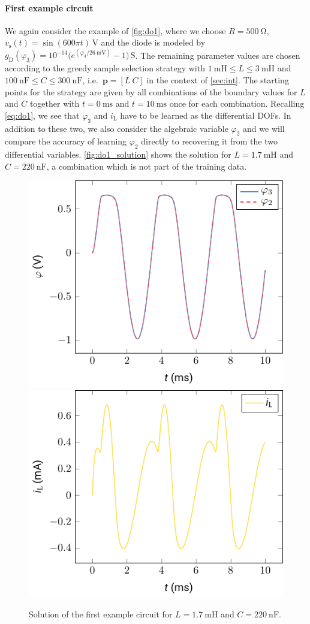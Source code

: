 \documentclass[AMA,STIX1COL]{WileyNJD-v2}
\newcommand{\mb}[1]{\mathbf{#1}}
\newcommand{\mr}[1]{\mathrm{#1}}
\begin{document}
\paragraph{First example circuit}
We again consider the example of \autoref{fig:do1}, where we choose $R = \SI{500}{\ohm}$, $v_\mr{s}(t) = \sin(600 \pi t)\, \si{\volt}$ and the diode is modeled by $g_\mr{D}(\varphi_3) = 10^{-14} \big( e^{(\varphi_3 / \SI{26}{\mV})} - 1 \big)\, \si{\siemens}$. The remaining parameter values are chosen according to the greedy sample selection strategy with $\SI{1}{\milli\henry} \leq L \leq \SI{3}{\milli\henry}$ and $\SI{100}{\nano\farad} \leq C \leq \SI{300}{\nano\farad}$, i.e.~$\mb{p} = [L\ C]$ in the context of \autoref{sec:int}. The starting points for the strategy are given by all combinations of the boundary values for $L$ and $C$ together with $t = \SI{0}{\ms}$ and $t = \SI{10}{\ms}$ once for each combination. Recalling \eqref{eq:do1}, we see that $\varphi_3$ and $i_\mr{L}$ have to be learned as the differential DOFs. In addition to these two, we also consider the algebraic variable $\varphi_2$ and we will compare the accuracy of learning $\varphi_2$ directly to recovering it from the two differential variables. \autoref{fig:do1_solution} shows the solution for $L = \SI{1.7}{\milli\henry}$ and $C = \SI{220}{\nano\farad}$, a combination which is not part of the training data.
\begin{figure}[t]
    \begin{center}
        \includegraphics[width=.4\textwidth]{do1_solution_phi} \hspace{1.5cm} \includegraphics[width=.4\textwidth]{do1_solution_i_L}
    \end{center}
    \caption{Solution of the first example circuit for $L = \SI{1.7}{\milli\henry}$ and $C = \SI{220}{\nano\farad}$.}
    \label{fig:do1_solution}
\end{figure}
\end{document}
